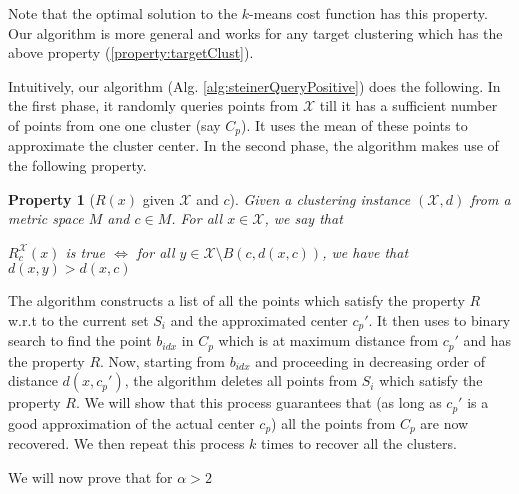 \documentclass[11pt]{article}
\newtheorem{property}[theorem]{Property}
\newcommand{\mc}{\mathcal}
\begin{document}
Note that the optimal solution to the $k$-means cost function has this property. Our algorithm is more general and works for any target clustering which has the above property (\ref{property:targetClust}).

Intuitively, our algorithm (Alg. \ref{alg:steinerQueryPositive}) does the following. In the first phase, it randomly queries points from $\mc X$ till it has a sufficient number of points from one one cluster (say $C_p$). It uses the mean of these points to approximate the cluster center. In the second phase, the algorithm makes use of the following property. 
\begin{property}[$R(x)$ given $\mc X$ and $c$]
\label{property:R}
Given a clustering instance $(\mc X, d)$ from a metric space $M$ and $c \in M$. For all $x \in \mc X$, we say that
\begin{center}
$R_{c}^{\mc X}(x)$ is true $\iff$ for all $y \in \mc X \setminus B(c, d(x, c))$, we have that $d(x, y) > d(x, c)$
\end{center}
\end{property} 
\noindent The algorithm constructs a list of all the points which satisfy the property $R$ w.r.t to the current set $S_i$ and the approximated center $c_p'$. It then uses to binary search to find the point $b_{idx}$ in $C_p$ which is at maximum distance from $c_p'$ and has the property $R$. Now, starting from $b_{idx}$ and proceeding in decreasing order of distance $d(x, c_p')$, the algorithm deletes all points from $S_i$ which satisfy the property $R$. We will show that this process guarantees that (as long as $c_p'$ is a good approximation of the actual center $c_p$) all the points from $C_p$ are now recovered. We then repeat this process $k$ times to recover all the clusters.

We will now prove that for $\alpha > 2$
\end{document}
